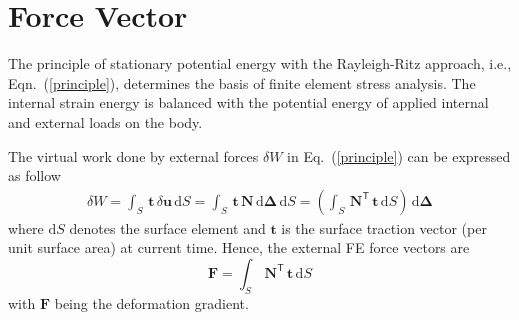 \section{Force Vector}



The principle of stationary potential energy with the Rayleigh-Ritz approach, i.e., Eqn.~(\ref{principle}), determines the basis of finite element stress analysis. The internal strain energy is balanced with the potential energy of applied internal and external loads on the body.

The virtual work done by external forces $\delta{W}$ in Eq.~(\ref{principle}) can be expressed as follow
\begin{equation}
\begin{aligned}
\delta{W} = \int_{S} \, \mathbf{t} \, \delta \mathbf{u} \, \mathrm{d} S
= \int_{S} \, \mathbf{t} \, \mathbf{N} \, \mathrm{d} \boldsymbol{\Delta} \, \mathrm{d} S
= \left( \int_{S} \, \mathbf{N}^{\mathsf{T}} \, \mathbf{t} \, \mathrm{d} S \right) \, \mathrm{d} \boldsymbol{\Delta}
\end{aligned}
\end{equation}
where $\mathrm{d} S$ denotes the surface element and $\mathbf{t}$ is the surface traction vector (per unit surface area) at current time. Hence, the external FE force vectors are
\begin{equation}
\mathbf{F} = \int_{S} \, \mathbf{N}^{\mathsf{T}} \, \mathbf{t} \, \mathrm{d} S 
\end{equation}
with $ \mathbf{F} $ being the deformation gradient.


